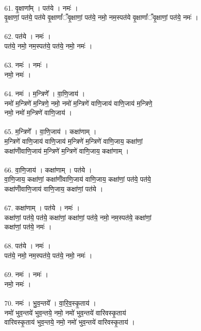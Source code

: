 \\
61. वृ॒क्षाणा᳚म् । पत॑ये । नमः॑ ।\\
वृ॒क्षाणां॒ पत॑ये॒ पत॑ये वृ॒क्षाणां᳚ँवृ॒क्षाणां॒ पत॑ये॒ नमो॒ नम॒स्पत॑ये वृ॒क्षाणां᳚ँवृ॒क्षाणां॒ पत॑ये॒ नमः॑ ।\\
\\
62. पत॑ये । नमः॑ ।\\
पत॑ये॒ नमो॒ नम॒स्पत॑ये॒ पत॑ये॒ नमो॒ नमः॑ ।\\
\\
63. नमः॑ । नमः॑ ।\\
नमो॒ नमः॑ ।\\
\\
64. नमः॑ । म॒न्त्रिणे᳚ । वा॒णि॒जाय॑ ।\\
नमो॑ म॒न्त्रिणे॑ म॒न्त्रिणे॒ नमो॒ नमो॑ म॒न्त्रिणे॑ वाणि॒जाय॑ वाणि॒जाय॑ म॒न्त्रिणे॒\\
नमो॒ नमो॑ म॒न्त्रिणे॑ वाणि॒जाय॑ ।\\
\\
65. म॒न्त्रिणे᳚ । वा॒णि॒जाय॑ । कक्षा॑णाम् ।\\
म॒न्त्रिणे॑ वाणि॒जाय॑ वाणि॒जाय॑ म॒न्त्रिणे॑ म॒न्त्रिणे॑ वाणि॒जाय॒ कक्षा॑णां॒\\
कक्षा॑णांँवाणि॒जाय॑ म॒न्त्रिणे॑ म॒न्त्रिणे॑ वाणि॒जाय॒ कक्षा॑णाम् ।\\
\\
66. वा॒णि॒जाय॑ । कक्षा॑णाम् । पत॑ये ।\\
वा॒णि॒जाय॒ कक्षा॑णां॒ कक्षा॑णांँवाणि॒जाय॑ वाणि॒जाय॒ कक्षा॑णां॒ पत॑ये॒ पत॑ये॒\\
कक्षा॑णांँवाणि॒जाय॑ वाणि॒जाय॒ कक्षा॑णां॒ पत॑ये ।\\
\\
67. कक्षा॑णाम् । पत॑ये । नमः॑ ।\\
कक्षा॑णां॒ पत॑ये॒ पत॑ये॒ कक्षा॑णां॒ कक्षा॑णां॒ पत॑ये॒ नमो॒ नम॒स्पत॑ये॒ कक्षा॑णां॒\\
कक्षा॑णां॒ पत॑ये॒ नमः॑ ।\\
\\
68. पत॑ये । नमः॑ ।\\
पत॑ये॒ नमो॒ नम॒स्पत॑ये॒ पत॑ये॒ नमो॒ नमः॑ ।\\
\\
69. नमः॑ । नमः॑ ।\\
नमो॒ नमः॑ ।\\
\\
70. नमः॑ । भु॒व॒न्तये᳚ । वा॒रि॒व॒स्कृ॒ताय॑ ।\\
नमो॑ भुव॒न्तये॑ भुव॒न्तये॒ नमो॒ नमो॑ भुव॒न्तये॑ वारिवस्कृ॒ताय॑\\
वारिवस्कृ॒ताय॑ भुव॒न्तये॒ नमो॒ नमो॑ भुव॒न्तये॑ वारिवस्कृ॒ताय॑ ।\\
